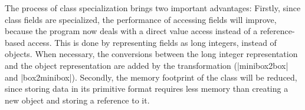 The process of class specialization brings two important advantages: Firstly, since class fields are specialized, the performance of accessing fields will improve, because the program now deals with a direct value access instead of a reference-based access. This is done by representing fields as long integers, instead of objects. When necessary, the conversions between the long integer representation and the object representation are added by the transformation (|minibox2box| and |box2minibox|). Secondly, the memory footprint of the class will be reduced, since storing data in its primitive format requires less memory than creating a new object and storing a reference to it.

